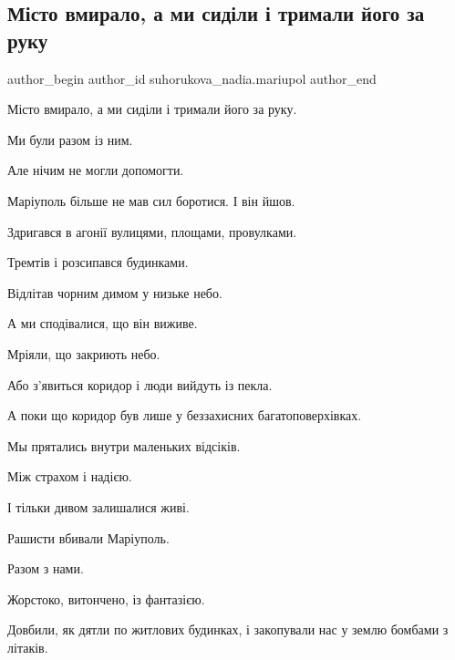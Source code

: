  
 
 
 
 

\subsection{Місто вмирало, а ми сиділи і тримали його за руку}
\label{sec:26_02_2023.fb.suhorukova_nadia.mariupol.1.m_sto_vmiralo__a_mi_}

\ifcmt
 author_begin
   author_id suhorukova_nadia.mariupol
 author_end
\fi

Місто вмирало, а ми сиділи і тримали його за руку.

Ми були разом із ним.

Але нічим не могли допомогти.

Маріуполь  більше не мав сил боротися.  І він йшов.

Здригався в агонії вулицями, площами, провулками.

Тремтів і розсипався будинками.

Відлітав чорним димом у низьке небо.

А ми сподівалися, що він виживе.

Мріяли, що закриють небо.

Або з'явиться коридор і люди вийдуть із пекла.

А поки що коридор був лише у беззахисних багатоповерхівках.

Мы прятались внутри маленьких відсіків. 

Між  страхом і надією.

І тільки дивом залишалися живі.

Рашисти вбивали Маріуполь. 

Разом з нами.

Жорстоко, витончено, із фантазією.

Довбили, як дятли по житлових будинках,  і закопували нас у землю бомбами з
літаків.

